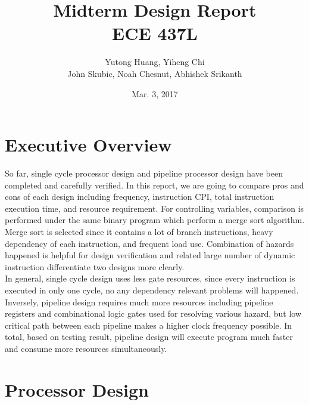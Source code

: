 \documentclass[12pt]{article}
\title{Midterm Design Report \\
	ECE 437L}
\author{Yutong Huang, Yiheng Chi \\
        John Skubic, Noah Chesnut, Abhishek Srikanth}
\date{Mar. 3, 2017}
\begin{document}
  \maketitle

  \newpage
  \section{Executive Overview}
  
  So far, single cycle processor design and pipeline processor design have been completed and carefully verified. In this report, we are going to compare pros and cons of each design including frequency, instruction CPI, total instruction execution time, and resource requirement. For controlling variables, comparison is performed under the same binary program which perform a merge sort algorithm. Merge sort is selected since it contains a lot of branch instructions, heavy dependency of each instruction, and frequent load use. Combination of hazards happened is helpful for design verification and related large number of dynamic instruction differentiate two designs more clearly. \\
  In general, single cycle design uses less gate resources, since every instruction is executed in only one cycle, no any dependency relevant problems will happened. Inversely, pipeline design requires much more resources including pipeline registers and combinational logic gates used for resolving various hazard, but low critical path between each pipeline makes a higher clock frequency possible. In total, based on testing result, pipeline design will execute program much faster and consume more resources simultaneously.

  \newpage
  \section{Processor Design}
\end{document}

